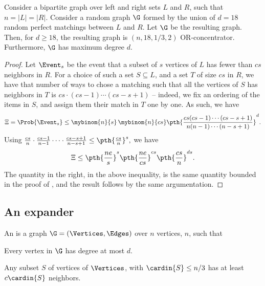\begin{theorem}
    Consider a bipartite graph over left and right sets $L$ and $R$,
    such that $n = |L|=|R|$. Consider a random graph $\G$ formed by
    the union of $d = 18$ random perfect matchings between $L$ and
    $R$.  Let $\G$ be the resulting graph. Then, for $d \geq 18$, the
    resulting graph is $(n,18, 1/3, 2)$ OR-concentrator. Furthermore,
    $\G$ has maximum degree $d$.
\end{theorem}
\begin{proof}
    Let $\Event_s$ be the event that a subset of $s$ vertices of $L$
    has fewer than $cs$ neighbors in $R$.  For a choice of such a set
    $S \subseteq L$, and a set $T$ of size $cs$ in $R$, we have that
    number of ways to chose a matching such that all the vertices of
    $S$ has neighbors in $T$ is $cs \cdot (cs-1) \cdots (cs -s+1)$ --
    indeed, we fix an ordering of the items in $S$, and assign them
    their match in $T$ one by one. As such, we have
    \begin{equation*}
        \Xi%
        =%
        \Prob{\bigl.\Event_s}%
        \leq%
        \mybinom{n}{s} \, \mybinom{n}{cs}
        \pth{ \frac{cs (cs-1) \cdots ( cs-s+1)}{n (n-1) \cdots (n-s+1)}}^{d}.%
    \end{equation*}
    Using
    \begin{math}
        \frac{cs}{n} \cdot \frac{cs-1}{n-1} \cdots \cdot
        \frac{cs-s+1}{n-s+1} \leq \pth{\frac{cs}{n}}^s,
    \end{math}
    we have
    \begin{equation*}            
        \Xi%
        \leq%
        \pth{\frac{ne}{s}}^s \pth{\frac{ne}{cs}}^{cs} \pth{
           \frac{cs}{n}}^{ds}.
    \end{equation*}
    The quantity in the right, in the above inequality, is the same
    quantity bounded in the proof of , and the
    result follows by the same argumentation.
\end{proof}


\subsection{An expander}

\begin{defn}
    An  is a graph $\G=(\Vertices,\Edges)$
    over $n$ vertices, $n$, such that
    \begin{compactenumi}
        \item Every vertex in $\G$ has degree at most $d$.
        
        \item Any subset $S$ of vertices of $\Vertices$, with
        $\cardin{S} \leq n/3$ has at least $c \cardin{S}$ neighbors.
    \end{compactenumi}
\end{defn}


